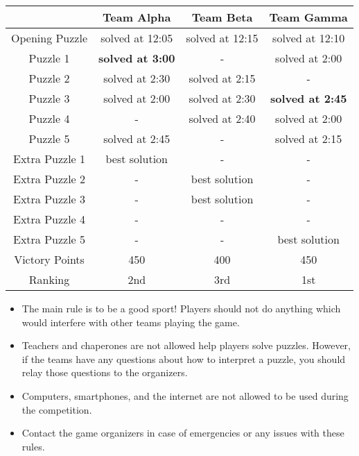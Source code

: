 \begin{rules}
\begin{center}
\begin{tabular}{c|c|c|c}
      & Team Alpha & Team Beta & Team Gamma \\\hline\hline
Opening Puzzle & solved at 12:05 & solved at 12:15 & solved at 12:10 \\\hline
Puzzle 1 & \textbf{solved at 3:00} & - & solved at 2:00 \\
Puzzle 2 & solved at 2:30 & solved at 2:15 & -  \\
Puzzle 3 & solved at 2:00 & solved at 2:30 & \textbf{solved at 2:45} \\
Puzzle 4 & - & solved at 2:40 & solved at 2:00 \\
Puzzle 5 & solved at 2:45 & - & solved at 2:15 \\\hline
Extra Puzzle 1 & best solution & - & - \\
Extra Puzzle 2 & - & best solution & - \\
Extra Puzzle 3 & - & best solution  & - \\
Extra Puzzle 4 & - & - & - \\
Extra Puzzle 5 & - & - & best solution \\\hline
Victory Points & 450 & 400 & 450 \\
Ranking & 2nd & 3rd & 1st
\end{tabular}
\end{center}

\vfill

\newpage


\begin{itemize}
\item The main rule is to be a good sport! Players should not do anything which
would interfere with other teams playing the game.
\item Teachers and chaperones are not allowed help players solve puzzles. However,
if the teams have any questions about how to interpret a puzzle, you should relay
those questions to the organizers.
\item Computers, smartphones, and the internet are not allowed to be used during
the competition.
\item Contact the game organizers in case of emergencies
or any issues with these rules.
\end{itemize}

\end{rules}